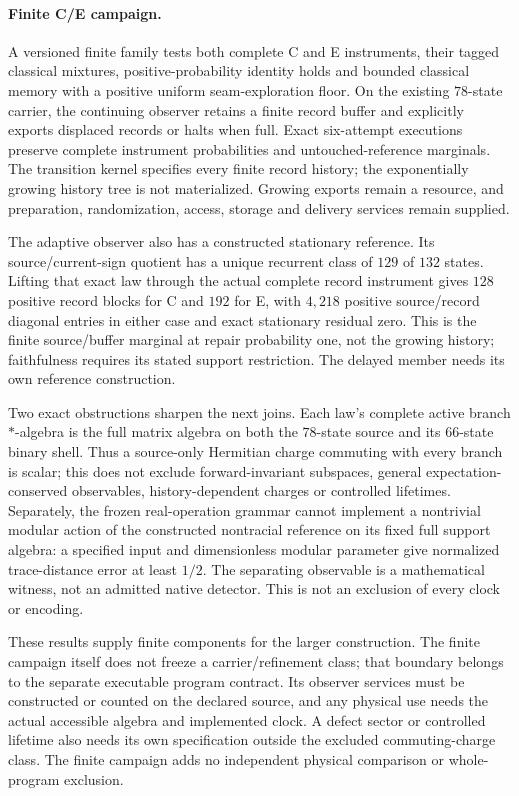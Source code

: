 \paragraph{Finite C/E campaign.}
A versioned finite family tests both complete C and E instruments,
their tagged classical mixtures, positive-probability identity holds and
bounded classical memory with a positive uniform seam-exploration floor.
On the existing $78$-state carrier, the continuing observer retains a finite
record buffer and explicitly exports displaced records or halts when full.
Exact six-attempt executions preserve complete instrument probabilities and
untouched-reference marginals. The transition kernel specifies every finite
record history; the exponentially growing history tree is not materialized.
Growing exports remain a resource, and preparation, randomization, access,
storage and delivery services remain supplied.

The adaptive observer also has a constructed stationary reference. Its
source/current-sign quotient has a unique recurrent class of $129$ of $132$
states. Lifting that exact law through the actual complete record instrument
gives $128$ positive record blocks for C and $192$ for E, with $4{,}218$
positive source/record diagonal entries in either case and exact stationary
residual zero. This is the finite source/buffer marginal at repair probability
one, not the growing history; faithfulness requires its stated support
restriction. The delayed member needs its own reference construction.

Two exact obstructions sharpen the next joins. Each law's complete active
branch $*$-algebra is the full matrix algebra on both the $78$-state source
and its $66$-state binary shell. Thus a source-only Hermitian charge commuting
with every branch is scalar; this does not exclude forward-invariant
subspaces, general expectation-conserved observables, history-dependent
charges or controlled lifetimes. Separately, the frozen real-operation grammar
cannot implement a nontrivial modular action of the constructed nontracial
reference on its fixed full support algebra: a specified input and
dimensionless modular parameter give normalized trace-distance error at
least $1/2$. The separating observable is a mathematical witness, not an
admitted native detector. This is not an exclusion of every clock or encoding.

These results supply finite components for the larger construction. The
finite campaign itself does not freeze a carrier/refinement class; that
boundary belongs to the separate executable program contract. Its observer
services must be constructed or counted on the declared source, and any
physical use needs the actual accessible algebra and implemented clock.
A defect sector or controlled lifetime also needs its own specification
outside the excluded commuting-charge class. The finite campaign adds no
independent physical comparison or whole-program exclusion.

